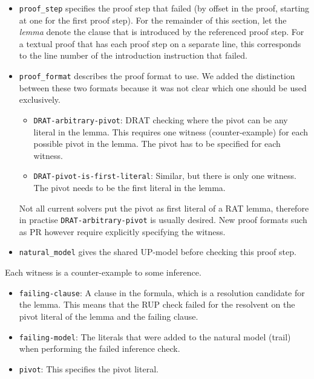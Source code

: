 \documentclass[
]{report}
\providecommand{\tightlist}{%
  \setlength{\itemsep}{0pt}\setlength{\parskip}{0pt}}
\begin{document}
\begin{itemize}
\item
  \texttt{proof\_step} specifies the proof step that failed (by offset
  in the proof, starting at one for the first proof step). For the
  remainder of this section, let the \emph{lemma} denote the clause that
  is introduced by the referenced proof step. For a textual proof that
  has each proof step on a separate line, this corresponds to the line
  number of the introduction instruction that failed.
\item
  \texttt{proof\_format} describes the proof format to use. We added the
  distinction between these two formats because it was not clear which
  one should be used exclusively.

  \begin{itemize}
  \tightlist
  \item
    \texttt{DRAT-arbitrary-pivot}: DRAT checking where the pivot can be
    any literal in the lemma. This requires one witness
    (counter-example) for each possible pivot in the lemma. The pivot
    has to be specified for each witness.
  \item
    \texttt{DRAT-pivot-is-first-literal}: Similar, but there is only one
    witness. The pivot needs to be the first literal in the lemma.
  \end{itemize}

  Not all current solvers put the pivot as first literal of a RAT lemma,
  therefore in practise \texttt{DRAT-arbitrary-pivot} is usually
  desired. New proof formats such as PR however require explicitly
  specifying the witness.
\item
  \texttt{natural\_model} gives the shared UP-model before checking this
  proof step.
\end{itemize}

Each witness is a counter-example to some inference.

\begin{itemize}
\tightlist
\item
  \texttt{failing-clause}: A clause in the formula, which is a
  resolution candidate for the lemma. This means that the RUP check
  failed for the resolvent on the pivot literal of the lemma and the
  failing clause.
\item
  \texttt{failing-model}: The literals that were added to the natural
  model (trail) when performing the failed inference check.
\item
  \texttt{pivot}: This specifies the pivot literal.
\end{itemize}
\end{document}
